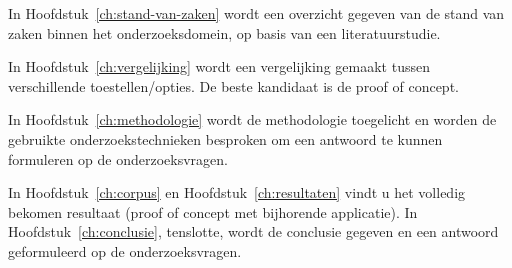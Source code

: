 In Hoofdstuk~\ref{ch:stand-van-zaken} wordt een overzicht gegeven van de stand van zaken binnen het onderzoeksdomein, op basis van een literatuurstudie.

In Hoofdstuk~\ref{ch:vergelijking} wordt een vergelijking gemaakt tussen verschillende toestellen/opties. De beste kandidaat is de proof of concept.

In Hoofdstuk~\ref{ch:methodologie} wordt de methodologie toegelicht en worden de gebruikte onderzoekstechnieken besproken om een antwoord te kunnen formuleren op de onderzoeksvragen.


In Hoofdstuk~\ref{ch:corpus} en Hoofdstuk~\ref{ch:resultaten} vindt u het volledig bekomen resultaat (proof of concept met bijhorende applicatie).
\newline
\newline
In Hoofdstuk~\ref{ch:conclusie}, tenslotte, wordt de conclusie gegeven en een antwoord geformuleerd op de onderzoeksvragen.
